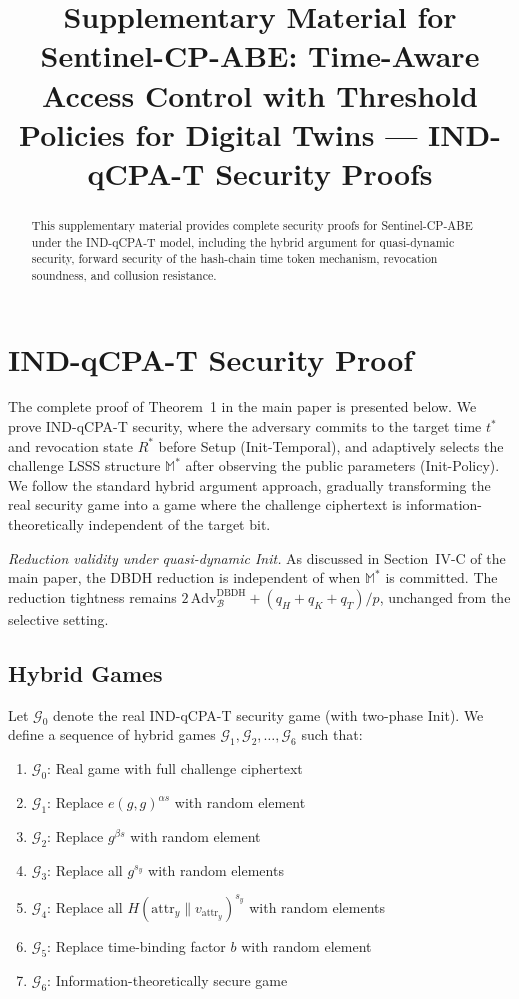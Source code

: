 \documentclass[lettersize,journal]{IEEEtran}
\title{Supplementary Material for Sentinel-CP-ABE: Time-Aware Access Control with Threshold Policies for Digital Twins --- IND-qCPA-T Security Proofs}
\author{
\IEEEauthorblockN{Xinkai Yang$^{1}$, Yaosheng Chen$^{1}$, and He Xiao$^{1,*}$}
\IEEEauthorblockA{
$^{1}$School of Industrial Software\\
Jiangxi University of Science and Technology,\\
Nanchang, China}
}
\begin{document}
\maketitle

\begin{abstract}
This supplementary material provides complete security proofs for Sentinel-CP-ABE under the IND-qCPA-T model, including the hybrid argument for quasi-dynamic security, forward security of the hash-chain time token mechanism, revocation soundness, and collusion resistance.
\end{abstract}

\section{IND-qCPA-T Security Proof}
\label{sec:indscpat_proof}

The complete proof of Theorem~1 in the main paper is presented below. We prove IND-qCPA-T security, where the adversary commits to the target time $t^*$ and revocation state $R^*$ before Setup (Init-Temporal), and adaptively selects the challenge LSSS structure $\mathbb{M}^*$ after observing the public parameters (Init-Policy). We follow the standard hybrid argument approach, gradually transforming the real security game into a game where the challenge ciphertext is information-theoretically independent of the target bit.

\emph{Reduction validity under quasi-dynamic Init.} As discussed in Section~IV-C of the main paper, the DBDH reduction is independent of when $\mathbb{M}^*$ is committed. The reduction tightness remains $2\,\text{Adv}_{\mathcal{B}}^{\text{DBDH}} + (q_H + q_K + q_T)/p$, unchanged from the selective setting.

\subsection{Hybrid Games}

Let $\mathcal{G}_0$ denote the real IND-qCPA-T security game (with two-phase Init). We define a sequence of hybrid games $\mathcal{G}_1, \mathcal{G}_2, \ldots, \mathcal{G}_6$ such that:

\begin{enumerate}
    \item $\mathcal{G}_0$: Real game with full challenge ciphertext
    \item $\mathcal{G}_1$: Replace $e(g,g)^{\alpha s}$ with random element
    \item $\mathcal{G}_2$: Replace $g^{\beta s}$ with random element
    \item $\mathcal{G}_3$: Replace all $g^{s_y}$ with random elements
    \item $\mathcal{G}_4$: Replace all $H(\mathrm{attr}_y \| v_{\mathrm{attr}_y})^{s_y}$ with random elements
    \item $\mathcal{G}_5$: Replace time-binding factor $b$ with random element
    \item $\mathcal{G}_6$: Information-theoretically secure game
\end{enumerate}
\end{document}
